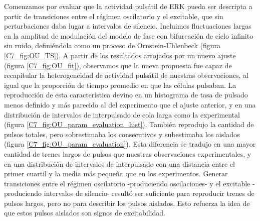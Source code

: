 \documentclass[./main.tex]{subfiles}
\begin{document}
Comenzamos por evaluar que la actividad pulsátil de ERK pueda ser descripta a partir de transiciones entre el régimen oscilatorio y el excitable, que sin perturbaciones daba lugar a intervalos de silencio. Incluimos fluctuaciones largas en la amplitud de modulación del modelo de fase con bifurcación de ciclo infinito sin ruido, definiéndola como un proceso de Ornstein-Uhlenbeck (figura \ref{C7_fig:OU_TS}). A partir de los resultados arrojados por un nuevo ajuste (figura  \ref{C7_fig:OU_fit}), observamos que la nueva propuesta fue capaz de recapitular la heterogeneidad de actividad pulsátil de nuestras observaciones, al igual que la proporción de tiempo promedio en que las células pulsaban. La reproducción de esta característica devino en un histograma de tasa de pulsado menos definido y más parecido al del experimento que el ajuste anterior, y en una distribución de intervalos de interpulsado de cola larga como la experimental (figura \ref{C7_fig:OU_param_evaluation_hist}). También reprodujo la cantidad de pulsos totales, pero sobrestimaba los consecutivos y subestimaba los aislados (figura \ref{C7_fig:OU_param_evaluation}). Esta diferencia se tradujo en una mayor cantidad de trenes largos de pulsos que nuestras observaciones experimentales, y en una distribución de intervalos de interpulsado con una distancia entre el primer cuartil y la media más pequeña que en los experimentos. Generar transiciones entre el régimen oscilatorio -produciendo oscilaciones- y el excitable -produciendo intervalos de silencio- resultó ser suficiente para reproducir trenes de pulsos largos, pero no para describir los pulsos aislados. Esto refuerza la idea de que estos pulsos aislados son signos de excitabilidad.
\end{document}
